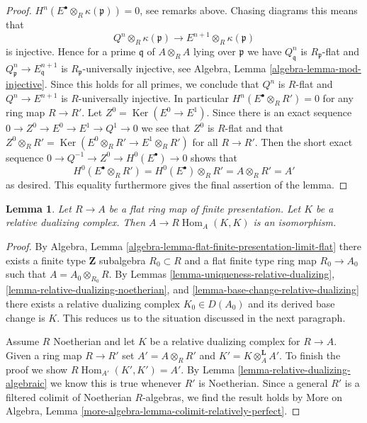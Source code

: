 \documentclass{stacks-project}
\theoremstyle{plain}
\newtheorem{lemma}[subsection]{Lemma}
\theoremstyle{definition}
\theoremstyle{remark}
\numberwithin{equation}{subsection}
\def\Hom{\mathop{\mathrm{Hom}}\nolimits}
\def\Ker{\mathop{\mathrm{Ker}}}
\begin{document}
\begin{proof}
$H^n(E^\bullet \otimes_R \kappa(\mathfrak p)) = 0$, see remarks above.
Chasing diagrams this means that
$$
Q^n \otimes_R \kappa(\mathfrak p) \to E^{n + 1} \otimes_R \kappa(\mathfrak p)
$$
is injective. Hence for a prime $\mathfrak q$ of $A \otimes_R A$
lying over $\mathfrak p$ we have $Q^n_\mathfrak q$ is $R_\mathfrak p$-flat
and $Q^n_\mathfrak p \to E^{n + 1}_\mathfrak q$ is
$R_\mathfrak p$-universally injective, see
Algebra, Lemma \ref{algebra-lemma-mod-injective}.
Since this holds for all primes,
we conclude that $Q^n$ is $R$-flat
and $Q^n \to E^{n + 1}$ is $R$-universally injective. In particular
$H^n(E^\bullet \otimes_R R') = 0$ for any ring map $R \to R'$.
Let $Z^0 = \Ker(E^0 \to E^1)$. Since there is an exact sequence
$0 \to Z^0 \to E^0 \to E^1 \to Q^1 \to 0$ we see that $Z^0$
is $R$-flat and that
$Z^0 \otimes_R R' = \Ker(E^0 \otimes_R R' \to E^1 \otimes_R R')$
for all $R \to R'$. Then the short exact sequence
$0 \to Q^{-1} \to Z^0 \to H^0(E^\bullet) \to 0$
shows that
$$
H^0(E^\bullet \otimes_R R') = H^0(E^\bullet) \otimes_R R'
= A \otimes_R R' = A'
$$
as desired. This equality furthermore gives the final assertion
of the lemma.
\end{proof}

\begin{lemma}
\label{lemma-relative-dualizing-RHom}
Let $R \to A$ be a flat ring map of finite presentation.
Let $K$ be a relative dualizing complex.
Then $A \to R\Hom_A(K, K)$ is an isomorphism.
\end{lemma}

\begin{proof}
By
Algebra, Lemma \ref{algebra-lemma-flat-finite-presentation-limit-flat}
there exists a finite type $\mathbf{Z}$ subalgebra $R_0 \subset R$
and a flat finite type ring map $R_0 \to A_0$ such that
$A = A_0 \otimes_{R_0} R$. By Lemmas
\ref{lemma-uniqueness-relative-dualizing},
\ref{lemma-relative-dualizing-noetherian}, and
\ref{lemma-base-change-relative-dualizing}
there exists a relative dualizing complex $K_0 \in D(A_0)$
and its derived base change is $K$.
This reduces us to the situation discussed in the next paragraph.

\medskip\noindent
Assume $R$ Noetherian and let $K$ be a relative dualizing complex
for $R \to A$. Given a ring map $R \to R'$ set $A' = A \otimes_R R'$
and $K' = K \otimes_A^\mathbf{L} A'$. To finish the proof we show
$R\Hom_{A'}(K', K') = A'$. By Lemma \ref{lemma-relative-dualizing-algebraic}
we know this is true whenever $R'$ is Noetherian.
Since a general $R'$ is a filtered colimit of Noetherian
$R$-algebras, we find the result holds by
More on Algebra, Lemma \ref{more-algebra-lemma-colimit-relatively-perfect}.
\end{proof}
\end{document}
